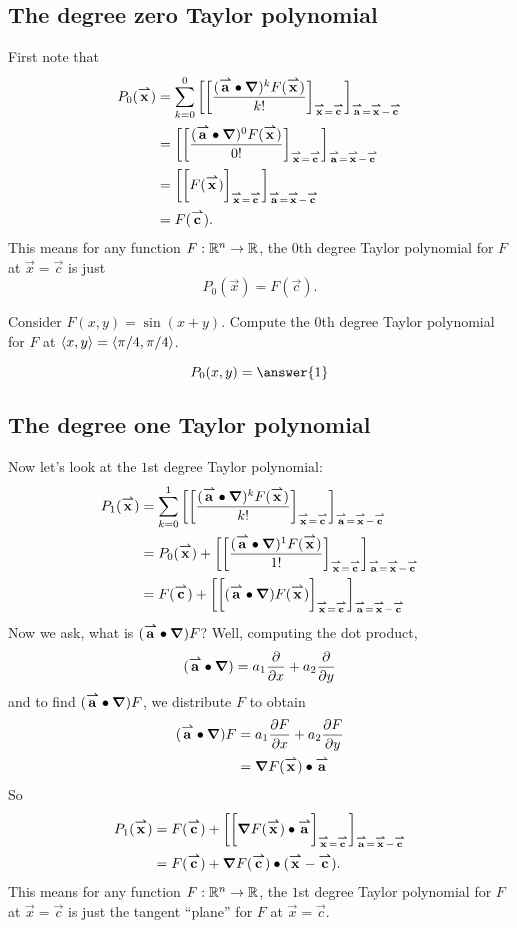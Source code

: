 \documentclass{ximera}
\begin{document}
\subsection{The degree zero Taylor polynomial}
First note that
\begin{align*}
  P_0(\vec{x}) &= \sum_{k=0}^0 \eval{\eval{\frac{(\vec{a}\dotp \grad)^k F(\vec{x})}{k!}}_{\vec{x}=\vec{c}}}_{\vec{a}=\vec{x}-\vec{c}}\\
  &=\eval{\eval{\frac{(\vec{a}\dotp \grad)^0 F(\vec{x})}{0!}}_{\vec{x}=\vec{c}}}_{\vec{a}=\vec{x}-\vec{c}}\\
  &=\eval{\eval{F(\vec{x})}_{\vec{x}=\vec{c}}}_{\vec{a}=\vec{x}-\vec{c}}\\
  &=F(\vec{c}).
\end{align*}
This means for any function $F:\R^n\to\R$, the $0$th degree Taylor
polynomial for $F$ at $\vec{x}=\vec{c}$ is just
\[
P_0(\vec{x})=F(\vec{c}).
\]
\begin{question}
  Consider $F(x,y)= \sin(x+y)$. Compute the $0$th degree Taylor
  polynomial for $F$ at $\vector{x,y} =\vector{\pi/4,\pi/4}$.
  \begin{prompt}
    \[
    P_0(x,y) = \answer{1}
    \]
  \end{prompt}
\end{question}

\subsection{The  degree one Taylor polynomial}
Now let's look at the $1$st degree Taylor polynomial:
\begin{align*}
  P_1(\vec{x})&= \sum_{k=0}^1 \eval{\eval{\frac{(\vec{a}\dotp \grad)^k F(\vec{x})}{k!}}_{\vec{x}=\vec{c}}}_{\vec{a}=\vec{x}-\vec{c}}\\
  &=P_0(\vec{x}) + \eval{\eval{\frac{(\vec{a}\dotp \grad)^1 F(\vec{x})}{1!}}_{\vec{x}=\vec{c}}}_{\vec{a}=\vec{x}-\vec{c}}\\
  &=F(\vec{c}) + \eval{\eval{(\vec{a}\dotp \grad) F(\vec{x})}_{\vec{x}=\vec{c}}}_{\vec{a}=\vec{x}-\vec{c}}
\end{align*}
Now we ask, what is $(\vec{a}\dotp\grad)F$?  Well, computing the dot
product,
\[
(\vec{a}\dotp\grad) = a_1 \pp{x} + a_2 \pp{y}
\]
and to find $(\vec{a}\dotp\grad)F$, we distribute $F$ to obtain
\begin{align*}
  (\vec{a}\dotp\grad)F &= a_1 \pp[F]{x} + a_2 \pp[F]{y}\\
  &= \grad F(\vec{x})\dotp \vec{a}
\end{align*}
So
\begin{align*}
  P_1(\vec{x})&=F(\vec{c}) + \eval{\eval{\grad F(\vec{x})\dotp\vec{a}}_{\vec{x}=\vec{c}}}_{\vec{a}=\vec{x}-\vec{c}}\\
  &=F(\vec{c}) +\grad F(\vec{c})\dotp (\vec{x}-\vec{c}).
\end{align*}
This means for any function $F:\R^n\to\R$, the $1$st degree Taylor
polynomial for $F$ at $\vec{x}=\vec{c}$ is just the tangent ``plane''
for $F$ at $\vec{x}= \vec{c}$.
\end{document}
